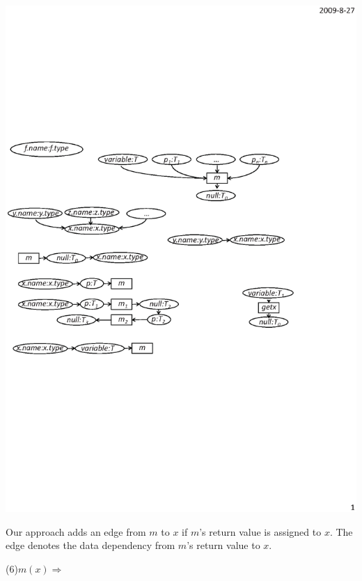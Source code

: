 \begin{center}
\includegraphics[scale=0.7,clip]{figure/rule5.eps}%
\end{center}

Our approach adds an edge from $m$ to $x$ if $m$'s return value is
assigned to $x$. The edge denotes the data dependency from $m$'s
return value to $x$.


(6)$m(x)\Rightarrow$

